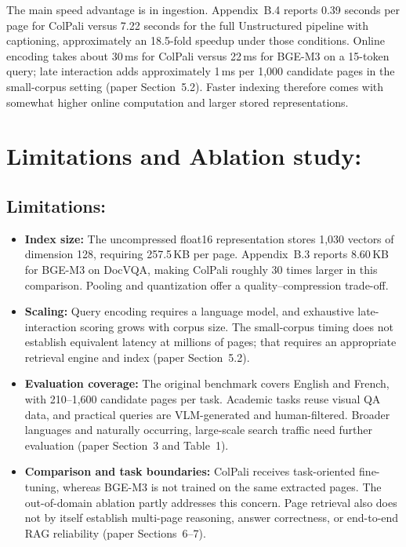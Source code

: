 \documentclass[11pt,a4paper]{article}
\begin{document}
The main speed advantage is in ingestion. Appendix~B.4 reports 0.39 seconds per page for ColPali versus 7.22 seconds for the full Unstructured pipeline with captioning, approximately an 18.5-fold speedup under those conditions. Online encoding takes about 30\,ms for ColPali versus 22\,ms for BGE-M3 on a 15-token query; late interaction adds approximately 1\,ms per 1,000 candidate pages in the small-corpus setting (paper Section~5.2). Faster indexing therefore comes with somewhat higher online computation and larger stored representations.


\section{Limitations and Ablation study:}
\subsection{Limitations:}
\begin{itemize}
    \item \textbf{Index size:} The uncompressed float16 representation stores 1,030 vectors of dimension 128, requiring 257.5\,KB per page. Appendix~B.3 reports 8.60\,KB for BGE-M3 on DocVQA, making ColPali roughly 30 times larger in this comparison. Pooling and quantization offer a quality--compression trade-off.
    \item \textbf{Scaling:} Query encoding requires a language model, and exhaustive late-interaction scoring grows with corpus size. The small-corpus timing does not establish equivalent latency at millions of pages; that requires an appropriate retrieval engine and index (paper Section~5.2).
    \item \textbf{Evaluation coverage:} The original benchmark covers English and French, with 210--1,600 candidate pages per task. Academic tasks reuse visual QA data, and practical queries are VLM-generated and human-filtered. Broader languages and naturally occurring, large-scale search traffic need further evaluation (paper Section~3 and Table~1).
    \item \textbf{Comparison and task boundaries:} ColPali receives task-oriented fine-tuning, whereas BGE-M3 is not trained on the same extracted pages. The out-of-domain ablation partly addresses this concern. Page retrieval also does not by itself establish multi-page reasoning, answer correctness, or end-to-end RAG reliability (paper Sections~6--7).
\end{itemize}
\end{document}
